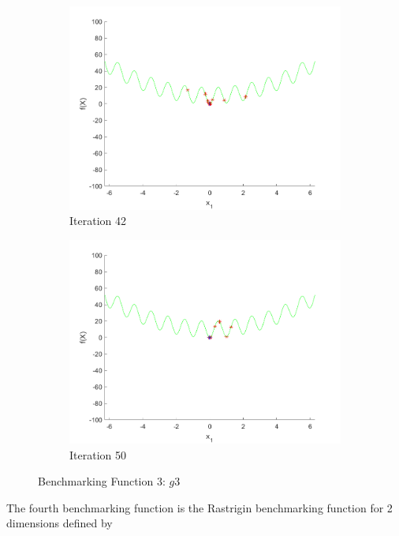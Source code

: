 \begin{figure}
\begin{subfigure}[b]{0.4\textwidth}
    \includegraphics[width=\textwidth]{img/smpl/rast1d/loa-iter-42}
    \caption{Iteration 42}
    \label{fig:s3-iter-6}
  \end{subfigure}
  \begin{subfigure}[b]{0.4\textwidth}
    \includegraphics[width=\textwidth]{img/smpl/rast1d/loa-iter-50}
    \caption{Iteration 50}
    \label{fig:s3-iter-7}
  \end{subfigure}
  \caption{Benchmarking Function 3: $g3$}
\end{figure}

\par The fourth benchmarking function is the Rastrigin benchmarking function for 2 dimensions defined by

